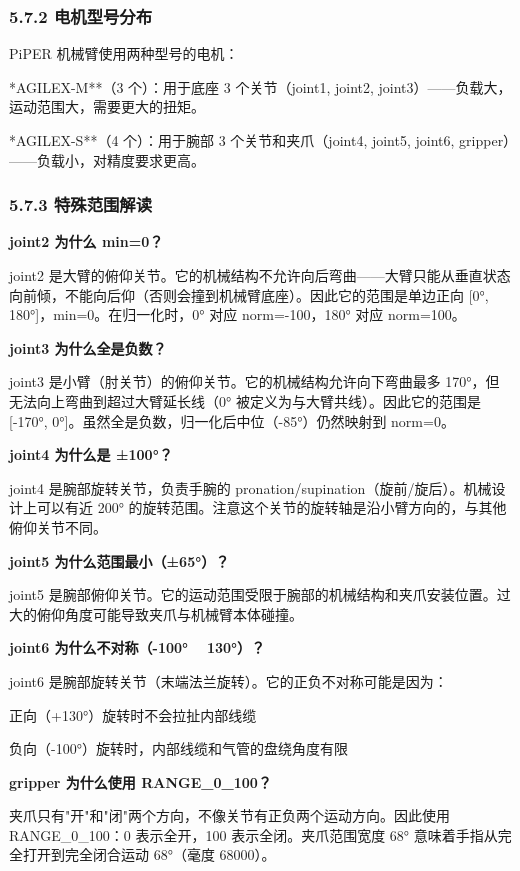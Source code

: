 \documentclass[UTF8,a4paper,11pt]{ctexart}
\begin{document}
{\subsubsection{5.7.2 电机型号分布}

PiPER 机械臂使用两种型号的电机：

\item **AGILEX-M**（3 个）：用于底座 3 个关节（joint1, joint2, joint3）——负载大，运动范围大，需要更大的扭矩。
\item **AGILEX-S**（4 个）：用于腕部 3 个关节和夹爪（joint4, joint5, joint6, gripper）——负载小，对精度要求更高。

\subsubsection{5.7.3 特殊范围解读}

\textbf{joint2 为什么 min=0？}

joint2 是大臂的俯仰关节。它的机械结构不允许向后弯曲——大臂只能从垂直状态向前倾，不能向后仰（否则会撞到机械臂底座）。因此它的范围是单边正向 [0°, 180°]，min=0。在归一化时，0° 对应 norm=-100，180° 对应 norm=100。

\textbf{joint3 为什么全是负数？}

joint3 是小臂（肘关节）的俯仰关节。它的机械结构允许向下弯曲最多 170°，但无法向上弯曲到超过大臂延长线（0° 被定义为与大臂共线）。因此它的范围是 [-170°, 0°]。虽然全是负数，归一化后中位（-85°）仍然映射到 norm=0。

\textbf{joint4 为什么是 ±100°？}

joint4 是腕部旋转关节，负责手腕的 pronation/supination（旋前/旋后）。机械设计上可以有近 200° 的旋转范围。注意这个关节的旋转轴是沿小臂方向的，与其他俯仰关节不同。

\textbf{joint5 为什么范围最小（±65°）？}

joint5 是腕部俯仰关节。它的运动范围受限于腕部的机械结构和夹爪安装位置。过大的俯仰角度可能导致夹爪与机械臂本体碰撞。

\textbf{joint6 为什么不对称（-100° ~ 130°）？}

joint6 是腕部旋转关节（末端法兰旋转）。它的正负不对称可能是因为：
\item 正向（+130°）旋转时不会拉扯内部线缆
\item 负向（-100°）旋转时，内部线缆和气管的盘绕角度有限

\textbf{gripper 为什么使用 RANGE_0_100？}

夹爪只有"开"和"闭"两个方向，不像关节有正负两个运动方向。因此使用 RANGE_0_100：0 表示全开，100 表示全闭。夹爪范围宽度 68° 意味着手指从完全打开到完全闭合运动 68°（毫度 68000）。

}
\end{document}
